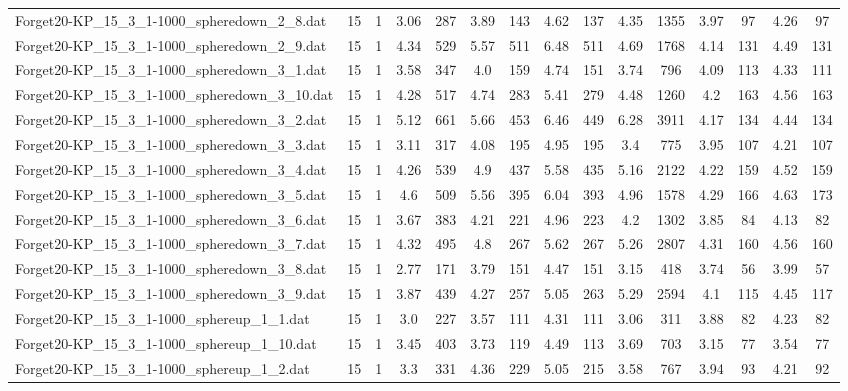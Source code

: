 \begin{table}[!ht]
{\begin{tabular}{lcccccccccccccc}
Forget20-KP\_15\_3\_1-1000\_spheredown\_2\_8.dat & 15 & 1 & 3.06 & 287 & 3.89 & 143 & 4.62 & 137 & 4.35 & 1355 & 3.97 & 97 & 4.26 & 97 \\
Forget20-KP\_15\_3\_1-1000\_spheredown\_2\_9.dat & 15 & 1 & 4.34 & 529 & 5.57 & 511 & 6.48 & 511 & 4.69 & 1768 & 4.14 & 131 & 4.49 & 131 \\
Forget20-KP\_15\_3\_1-1000\_spheredown\_3\_1.dat & 15 & 1 & 3.58 & 347 & 4.0 & 159 & 4.74 & 151 & 3.74 & 796 & 4.09 & 113 & 4.33 & 111 \\
Forget20-KP\_15\_3\_1-1000\_spheredown\_3\_10.dat & 15 & 1 & 4.28 & 517 & 4.74 & 283 & 5.41 & 279 & 4.48 & 1260 & 4.2 & 163 & 4.56 & 163 \\
Forget20-KP\_15\_3\_1-1000\_spheredown\_3\_2.dat & 15 & 1 & 5.12 & 661 & 5.66 & 453 & 6.46 & 449 & 6.28 & 3911 & 4.17 & 134 & 4.44 & 134 \\
Forget20-KP\_15\_3\_1-1000\_spheredown\_3\_3.dat & 15 & 1 & 3.11 & 317 & 4.08 & 195 & 4.95 & 195 & 3.4 & 775 & 3.95 & 107 & 4.21 & 107 \\
Forget20-KP\_15\_3\_1-1000\_spheredown\_3\_4.dat & 15 & 1 & 4.26 & 539 & 4.9 & 437 & 5.58 & 435 & 5.16 & 2122 & 4.22 & 159 & 4.52 & 159 \\
Forget20-KP\_15\_3\_1-1000\_spheredown\_3\_5.dat & 15 & 1 & 4.6 & 509 & 5.56 & 395 & 6.04 & 393 & 4.96 & 1578 & 4.29 & 166 & 4.63 & 173 \\
Forget20-KP\_15\_3\_1-1000\_spheredown\_3\_6.dat & 15 & 1 & 3.67 & 383 & 4.21 & 221 & 4.96 & 223 & 4.2 & 1302 & 3.85 & 84 & 4.13 & 82 \\
Forget20-KP\_15\_3\_1-1000\_spheredown\_3\_7.dat & 15 & 1 & 4.32 & 495 & 4.8 & 267 & 5.62 & 267 & 5.26 & 2807 & 4.31 & 160 & 4.56 & 160 \\
Forget20-KP\_15\_3\_1-1000\_spheredown\_3\_8.dat & 15 & 1 & 2.77 & 171 & 3.79 & 151 & 4.47 & 151 & 3.15 & 418 & 3.74 & 56 & 3.99 & 57 \\
Forget20-KP\_15\_3\_1-1000\_spheredown\_3\_9.dat & 15 & 1 & 3.87 & 439 & 4.27 & 257 & 5.05 & 263 & 5.29 & 2594 & 4.1 & 115 & 4.45 & 117 \\
Forget20-KP\_15\_3\_1-1000\_sphereup\_1\_1.dat & 15 & 1 & 3.0 & 227 & 3.57 & 111 & 4.31 & 111 & 3.06 & 311 & 3.88 & 82 & 4.23 & 82 \\
Forget20-KP\_15\_3\_1-1000\_sphereup\_1\_10.dat & 15 & 1 & 3.45 & 403 & 3.73 & 119 & 4.49 & 113 & 3.69 & 703 & 3.15 & 77 & 3.54 & 77 \\
Forget20-KP\_15\_3\_1-1000\_sphereup\_1\_2.dat & 15 & 1 & 3.3 & 331 & 4.36 & 229 & 5.05 & 215 & 3.58 & 767 & 3.94 & 93 & 4.21 & 92 \\

\end{tabular}}
\end{table}
